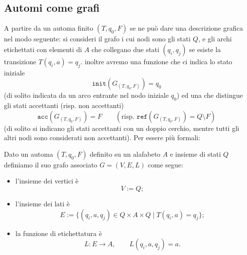 \subsection{Automi come grafi}
A partire da un automa finito $(T,q_0,F)$ se ne può dare una descrizione grafica nel modo seguente: si consideri il grafo i cui nodi sono gli stati $Q$, e gli archi etichettati con elementi di $A$ che collegano due stati $(q_i,q_j)$ se esiste la transizione $T(q_i,a)=q_j$.
inoltre avremo una funzione che ci indica lo stato iniziale
\[
\texttt{init}(G_{(T,q_0,F)}) = q_0
\]
(di solito indicata da un arco entrante nel nodo iniziale $q_0$) ed una che distingue gli stati accettanti (risp. non accettanti)
\[
\texttt{acc}(G_{(T,q_0,F)}) = F \qquad (\text{risp. } \texttt{ref}(G_{(T,q_0,F)}) = Q \setminus F)
\]
(di solito si indicano gli stati accettanti con un doppio cerchio, mentre tutti gli altri nodi sono considerati non accettanti).
Per essere più formali:
\begin{defi}
Dato un automa $(T,q_0,F)$ definito su un alafabeto $A$ e insieme di stati $Q$ definiamo il suo grafo associato $G=(V,E,L)$ come segue:
\begin{itemize}
    \item l'insieme dei vertici è
    \[
    V:=Q;
    \]
    \item l'insieme dei lati è
    \[
    E:=\{(q_i,a,q_j)\in Q\times A\times Q \mid T(q_i,a)=q_j\};
    \]
    \item la funzione di etichettatura è
    \[
    L:E\to A, \qquad L(q_i,a,q_j)=a.
    \]
\end{itemize}
\end{defi}

